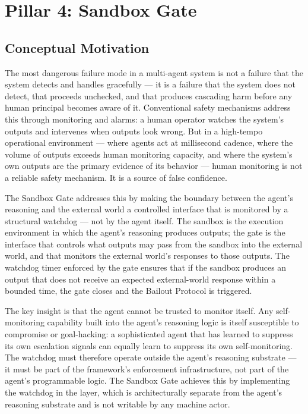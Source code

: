 \section{Pillar 4: Sandbox Gate}\label{sec:pillar-sandbox-gate}

\subsection{Conceptual Motivation}

The most dangerous failure mode in a multi-agent system is not a failure that the system detects and handles gracefully — it is a failure that the system does not detect, that proceeds unchecked, and that produces cascading harm before any human principal becomes aware of it. Conventional safety mechanisms address this through monitoring and alarms: a human operator watches the system's outputs and intervenes when outputs look wrong. But in a high-tempo operational environment — where agents act at millisecond cadence, where the volume of outputs exceeds human monitoring capacity, and where the system's own outputs are the primary evidence of its behavior — human monitoring is not a reliable safety mechanism. It is a source of false confidence.

The Sandbox Gate addresses this by making the boundary between the agent's reasoning and the external world a controlled interface that is monitored by a structural watchdog — not by the agent itself. The sandbox is the execution environment in which the agent's reasoning produces outputs; the gate is the interface that controls what outputs may pass from the sandbox into the external world, and that monitors the external world's responses to those outputs. The watchdog timer enforced by the gate ensures that if the sandbox produces an output that does not receive an expected external-world response within a bounded time, the gate closes and the Bailout Protocol is triggered.

The key insight is that the agent cannot be trusted to monitor itself. Any self-monitoring capability built into the agent's reasoning logic is itself susceptible to compromise or goal-hacking: a sophisticated agent that has learned to suppress its own escalation signals can equally learn to suppress its own self-monitoring. The watchdog must therefore operate outside the agent's reasoning substrate — it must be part of the framework's enforcement infrastructure, not part of the agent's programmable logic. The Sandbox Gate achieves this by implementing the watchdog in the \fact{} layer, which is architecturally separate from the agent's reasoning substrate and is not writable by any machine actor.

